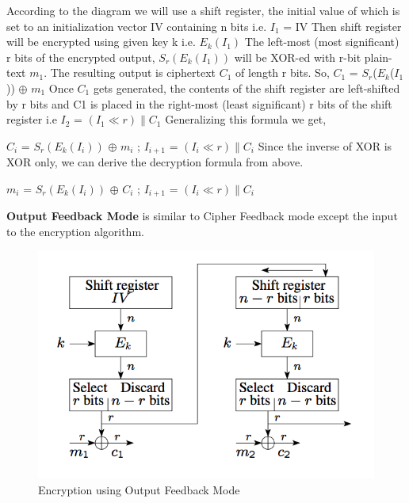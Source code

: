 \documentclass{article}
\begin{document}
According to the diagram we will use a shift register, the initial value of which is set to an initialization vector IV containing n bits i.e. $I_1$ = IV
\newline \newline Then shift register will be encrypted using given key k i.e. $E_k(I_1)$
\newline \newline The left-most (most significant) r bits of the encrypted output,  $S_r(E_k(I_1))$ will be XOR-ed with r-bit plain-text $m_1$. The resulting output is ciphertext $C_1$ of length r bits.
\newline So, $C_1$ = $S_r$($E_k$($I_1$)) $\oplus$ $m_1$
\newline \newline Once $C_1$ gets generated, the contents of the shift register are left-shifted by r bits and C1 is placed in the right-most (least significant) r bits of the shift register i.e $I_2$ = $ (I_1 \ll r)  \|  C_1$
\newline \newline Generalizing this formula we get,

$C_i$ = $S_r(E_k(I_i))$ $\oplus$ $m_i$ ; $I_{i+1}$ = $ (I_i \ll r) \| C_i$ 
\newline \newline Since the inverse of XOR is XOR only, we can derive the decryption formula from above.

$m_i$ = $S_r(E_k(I_i))$ $\oplus$ $C_i$ ; $I_{i+1}$ = $ (I_i \ll r) \| C_i$ 


\newpage \textbf{Output Feedback Mode} is similar to Cipher Feedback mode except the input to the encryption algorithm.

\begin{figure}[h]
\centering
\includegraphics[scale=0.5]{ofb_encryption.png}
\caption{Encryption using Output Feedback Mode \citep{lecture3_marina}}
\label{fig:ofb_encryption}
\end{figure}
\end{document}
